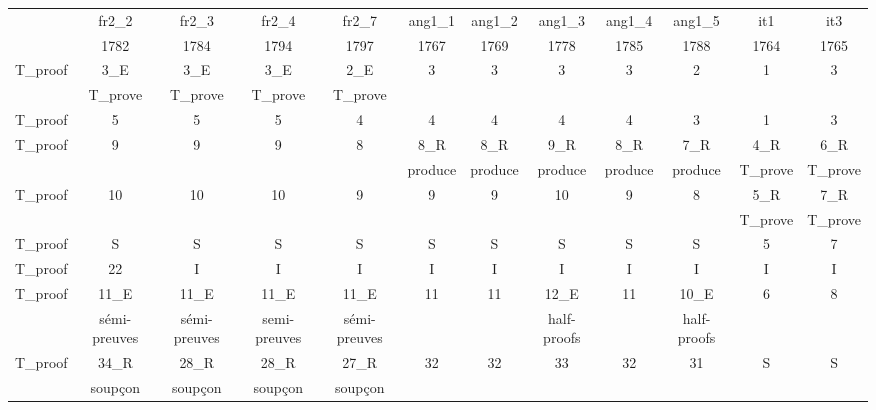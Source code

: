 \begin{table}
\caption{Échantillon du tableau d’alignement avancé avec l’identifiant \og~T\_proof~\fg{}}
\begin{longtable}{|c|c|c|c|c|c|c|c|c|c|c|c|}
\hline

 & fr2\_2 & fr2\_3 & fr2\_4 & fr2\_7 & ang1\_1 & ang1\_2 & ang1\_3 & ang1\_4 & ang1\_5 & it1 & it3 \\
 & 1782 & 1784 & 1794 & 1797 & 1767 & 1769 & 1778 & 1785 & 1788 & 1764 & 1765 \\ \hline
T\_proof & 3\_E & 3\_E & 3\_E & 2\_E & 3 & 3 & 3 & 3 & 2 & 1 & 3 \\
 & T\_prove & T\_prove & T\_prove & T\_prove &  &  &  &  &  &  &  \\ \hline
T\_proof & 5 & 5 & 5 & 4 & 4 & 4 & 4 & 4 & 3 & 1 & 3 \\ \hline
T\_proof & 9 & 9 & 9 & 8 & 8\_R & 8\_R & 9\_R & 8\_R & 7\_R & 4\_R & 6\_R \\
 &  &  &  &  & produce & produce & produce & produce & produce & T\_prove & T\_prove \\ \hline
T\_proof & 10 & 10 & 10 & 9 & 9 & 9 & 10 & 9 & 8 & 5\_R & 7\_R \\
 &  &  &  &  &  &  &  &  &  & T\_prove & T\_prove \\ \hline
T\_proof & S & S & S & S & S & S & S & S & S & 5 & 7 \\ \hline
T\_proof & 22 & I & I & I & I & I & I & I & I & I & I \\ \hline
T\_proof & 11\_E & 11\_E & 11\_E & 11\_E & 11 & 11 & 12\_E & 11 & 10\_E & 6 & 8 \\
 & sémi-preuves & sémi-preuves & semi-preuves & sémi-preuves &  &  & half-proofs &  & half-proofs &  &  \\ \hline
T\_proof & 34\_R & 28\_R & 28\_R & 27\_R & 32 & 32 & 33 & 32 & 31 & S & S \\
 & soupçon & soupçon & soupçon & soupçon &  &  &  &  &  &  &  \\ \hline
 
\end{longtable}
\label{table:alignement_avance}
\end{table}